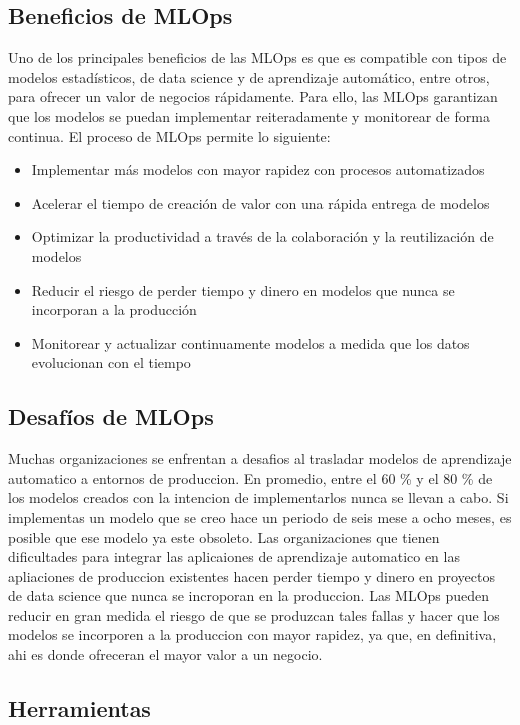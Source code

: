 \documentclass[twoside,twocolumn]{article}
\begin{document}
\subsection{Beneficios de MLOps}
Uno de los principales beneficios de las MLOps es que es compatible con tipos de modelos estadísticos, de data science y de aprendizaje automático, entre otros, para ofrecer un valor de negocios rápidamente. Para ello, las MLOps garantizan que los modelos se puedan implementar reiteradamente y monitorear de forma continua. El proceso de MLOps permite lo siguiente:
\begin{itemize}
    \item Implementar más modelos con mayor rapidez con procesos automatizados
    \item Acelerar el tiempo de creación de valor con una rápida entrega de modelos
    \item Optimizar la productividad a través de la colaboración y la reutilización de modelos
    \item Reducir el riesgo de perder tiempo y dinero en modelos que nunca se incorporan a la producción
    \item Monitorear y actualizar continuamente modelos a medida que los datos evolucionan con el tiempo  
\end{itemize}

\subsection{Desafíos de MLOps}
Muchas organizaciones se enfrentan a desafios al trasladar modelos de aprendizaje automatico a entornos de produccion.
En promedio, entre el 60 \% y el 80 \% de los modelos creados con la intencion de implementarlos nunca se llevan a cabo.
Si implementas un modelo que se creo hace un periodo de seis mese a ocho meses, es posible que ese modelo ya este obsoleto.
Las organizaciones que tienen dificultades para integrar las aplicaiones de aprendizaje automatico en las apliaciones de produccion existentes hacen perder tiempo y dinero en proyectos de data science que nunca se incroporan en la produccion.
Las MLOps pueden reducir en gran medida el riesgo de que se produzcan tales fallas y hacer que los modelos se incorporen a la produccion con mayor rapidez, ya que, en definitiva, ahi es donde ofreceran el mayor valor a un negocio.
\subsection{Herramientas}
\end{document}
